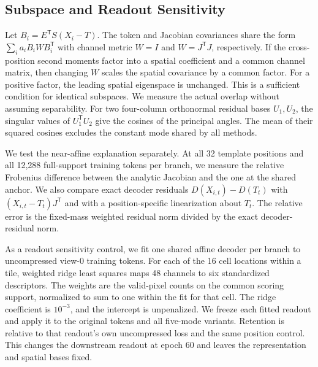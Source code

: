 \subsection{Subspace and Readout Sensitivity}\label{sec:readout-method}
Let $B_i=E^\mathsf{T}S(X_i-T)$. The token and Jacobian covariances share the form $\sum_i a_i B_i W B_i^\mathsf{T}$ with channel metric $W=I$ and $W=J^\mathsf{T}J$, respectively. If the cross-position second moments factor into a spatial coefficient and a common channel matrix, then changing $W$ scales the spatial covariance by a common factor. For a positive factor, the leading spatial eigenspace is unchanged. This is a sufficient condition for identical subspaces. We measure the actual overlap without assuming separability. For two four-column orthonormal residual bases $U_1,U_2$, the singular values of $U_1^\mathsf{T}U_2$ give the cosines of the principal angles. The mean of their squared cosines excludes the constant mode shared by all methods.

We test the near-affine explanation separately. At all 32 template positions and all 12,288 full-support training tokens per branch, we measure the relative Frobenius difference between the analytic Jacobian and the one at the shared anchor. We also compare exact decoder residuals $D(X_{i,t})-D(T_t)$ with $(X_{i,t}-T_t)J^\mathsf{T}$ and with a position-specific linearization about $T_t$. The relative error is the fixed-mass weighted residual norm divided by the exact decoder-residual norm.

As a readout sensitivity control, we fit one shared affine decoder per branch to uncompressed view-0 training tokens. For each of the 16 cell locations within a tile, weighted ridge least squares maps 48 channels to six standardized descriptors. The weights are the valid-pixel counts on the common scoring support, normalized to sum to one within the fit for that cell. The ridge coefficient is $10^{-3}$, and the intercept is unpenalized. We freeze each fitted readout and apply it to the original tokens and all five-mode variants. Retention is relative to that readout's own uncompressed loss and the same position control. This changes the downstream readout at epoch 60 and leaves the representation and spatial bases fixed.
